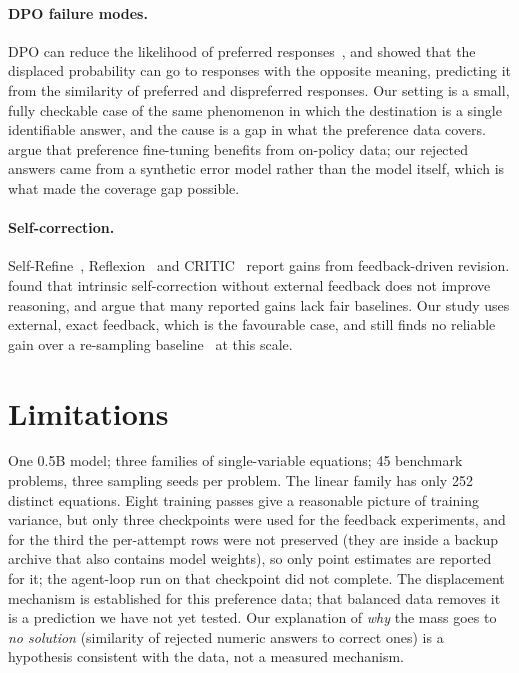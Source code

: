 \documentclass[10pt]{article}
\newcommand{\nosol}{\emph{no solution}}
\begin{document}
\paragraph{DPO failure modes.} DPO can reduce the likelihood of preferred
responses~\citep{pal2024smaug,feng2024limitations}, and \citet{razin2025displacement}
showed that the displaced probability can go to responses with the opposite meaning,
predicting it from the similarity of preferred and dispreferred responses. Our setting
is a small, fully checkable case of the same phenomenon in which the destination is a
single identifiable answer, and the cause is a gap in what the preference data
covers. \citet{tajwar2024preference} argue that preference fine-tuning benefits from
on-policy data; our rejected answers came from a synthetic error model rather than the
model itself, which is what made the coverage gap possible.

\paragraph{Self-correction.} Self-Refine~\citep{madaan2023selfrefine},
Reflexion~\citep{shinn2023reflexion} and CRITIC~\citep{gou2024critic} report gains from
feedback-driven revision. \citet{huang2024cannot} found that intrinsic self-correction
without external feedback does not improve reasoning, and \citet{kamoi2024survey} argue
that many reported gains lack fair baselines. Our study uses external, exact feedback,
which is the favourable case, and still finds no reliable gain over a re-sampling
baseline~\citep{brown2024monkeys} at this scale.

\section{Limitations}
\label{sec:limits}
One 0.5B model; three families of single-variable equations; 45 benchmark problems,
three sampling seeds per problem. The linear family has only 252 distinct equations.
Eight training passes give a reasonable picture of training variance, but only three
checkpoints were used for the feedback experiments, and for the third the per-attempt
rows were not preserved (they are inside a backup archive that also contains model
weights), so only point estimates are reported for it; the agent-loop run on that
checkpoint did not complete. The displacement mechanism is established for this
preference data; that balanced data removes it is a prediction we have not yet tested.
Our explanation of \emph{why} the mass goes to \nosol{} (similarity of rejected numeric
answers to correct ones) is a hypothesis consistent with the data, not a measured
mechanism.
\end{document}
